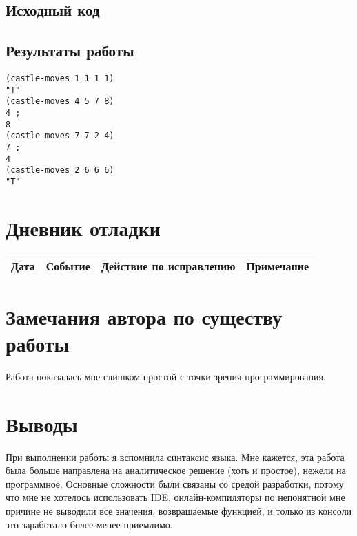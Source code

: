 \documentclass[12pt]{article}
\begin{document}
\subsection{Исходный код}


\subsection{Результаты работы}
\begin{lstlisting}
(castle-moves 1 1 1 1)
"T"
(castle-moves 4 5 7 8)
4 ;
8
(castle-moves 7 7 2 4)
7 ;
4
(castle-moves 2 6 6 6)
"T"

\end{lstlisting}

\section{Дневник отладки}
\begin{tabular}{|c|c|c|c|}
\hline
Дата & Событие & Действие по исправлению & Примечание \\
\hline
\end{tabular}

\section{Замечания автора по существу работы}
Работа показалась мне слишком простой с точки зрения программирования. 

\section{Выводы}
При выполнении работы я вспомнила синтаксис языка. Мне кажется, эта работа была больше направлена на аналитическое решение (хоть и простое), нежели на программное. Основные сложности были связаны со средой разработки, потому что мне не хотелось использовать IDE, онлайн-компиляторы по непонятной мне причине не выводили все значения, возвращаемые функцией, и только из консоли это заработало более-менее приемлимо.
\end{document}
